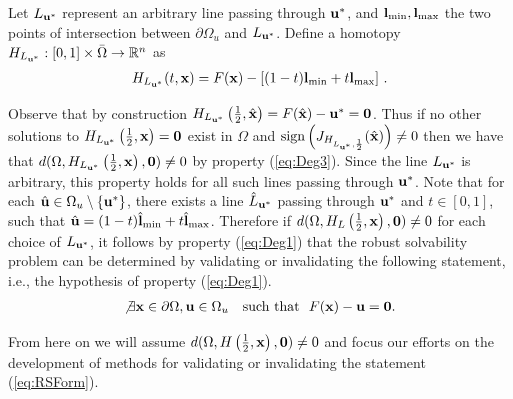Let $L_{\mathbf{u}^*}$ represent an arbitrary line passing through $\mathbf{u}^*$, and $\mathbf{l}_{\min},\mathbf{l}_{\max}$ the two points of intersection between $\partial\Omega_u$ and $L_{\mathbf{u}^*}$. 
Define a homotopy $H_{L_{\mathbf{u}^*}} : [0,1]\times\bar{\Omega}\rightarrow\mathbb{R}^n$ as 
\begin{align}
H_{L_{\mathbf{u}^*}}(t,\mathbf{x}) = F(\mathbf{x})-\left[(1-t)\mathbf{l}_{\min}+t\mathbf{l}_{\max}\right]\,. \label{eq:Homo}
\end{align}

Observe that by construction $H_{L_{\mathbf{u}^*}}\left(\frac{1}{2},\hat{\mathbf{x}}\right)=F(\hat{\mathbf{x}})-\mathbf{u}^*=\mathbf{0}$. 
Thus if no other solutions to $H_{L_{\mathbf{u}^*}}\left(\frac{1}{2},\mathbf{x}\right)=\mathbf{0}$ exist in $\Omega$ and $ \operatorname{sign}\left(J_{H_{L_{\mathbf{u}^*},\frac{1}{2}}}(\hat{\mathbf{x}})\right) \neq 0$ then we have that $ d(\Omega,H_{L_{\mathbf{u}^*}}\left(\frac{1}{2},\mathbf{x}\right),\mathbf{0})\neq 0$ by property (\ref{eq:Deg3}). 
Since the line $L_{\mathbf{u}^*}$ is arbitrary, this property holds for all such lines passing through $\mathbf{u}^*$.
Note that for each $\hat{\mathbf{u}}\in\Omega_u\setminus\{\mathbf{u}^*\}$, there exists a line $\hat{L}_{\mathbf{u}^*}$ passing through $\mathbf{u}^*$ and $t\in[0,1]$,  such that $\hat{\mathbf{u}}=(1-t)\hat{\mathbf{l}}_{\min}+t\hat{\mathbf{l}}_{\max}$. 
Therefore if $d(\Omega,H_L\left(\frac{1}{2},\mathbf{x}\right),\mathbf{0})\neq 0$ for each choice of $L_{\mathbf{u}^*}$, it follows by property (\ref{eq:Deg1}) that the robust solvability problem can be determined by validating or invalidating the following statement, i.e., the hypothesis of property (\ref{eq:Deg1}).
\begin{align}
\not\exists \mathbf{x}\in\partial\Omega, \mathbf{u}\in\Omega_u \ \ \mbox{ such that } \ F(\mathbf{x})-\mathbf{u}=\mathbf{0}. \label{eq:RSForm}
\end{align}

From here on we will assume $d(\Omega,H\left(\frac{1}{2},\mathbf{x}\right),\mathbf{0})\neq 0$ and focus our efforts on the development of methods for validating or invalidating the statement (\ref{eq:RSForm}).

